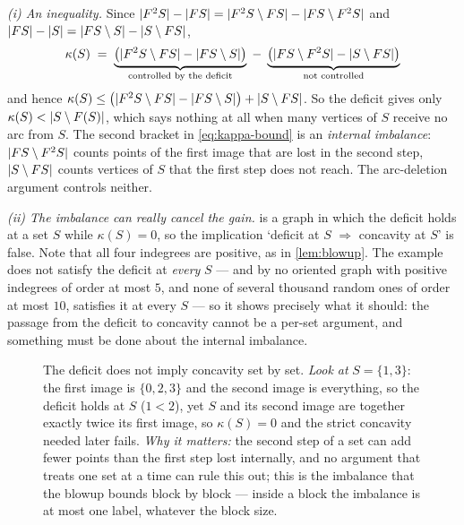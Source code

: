 \emph{(i) An inequality.} Since $\lvert F^2S\rvert-\lvert FS\rvert=\lvert F^2S\setminus FS\rvert-\lvert FS\setminus F^2S\rvert$
and $\lvert FS\rvert-\lvert S\rvert=\lvert FS\setminus S\rvert-\lvert S\setminus FS\rvert$,
\begin{equation}\label{eq:kappa-bound}
 \kappa(S)
 \;=\;\underbrace{\bigl(\lvert F^2S\setminus FS\rvert-\lvert FS\setminus S\rvert\bigr)}_{\text{controlled by
 the deficit}}
 \;-\;\underbrace{\bigl(\lvert FS\setminus F^2S\rvert-\lvert S\setminus FS\rvert\bigr)}_{\text{not controlled}}
\end{equation}
and hence $\kappa(S)\le\bigl(\lvert F^2S\setminus FS\rvert-\lvert FS\setminus S\rvert\bigr)+\lvert S\setminus FS\rvert$.
So the deficit gives only $\kappa(S)<\lvert S\setminus F(S)\rvert$, which says nothing at all when many
vertices of $S$ receive no arc from $S$. The second bracket in \eqref{eq:kappa-bound} is an
\emph{internal imbalance}: $\lvert FS\setminus F^2S\rvert$ counts points of the first image that are lost in
the second step, $\lvert S\setminus FS\rvert$ counts vertices of $S$ that the first step does not reach. The
arc-deletion argument controls neither.

\emph{(ii) The imbalance can really cancel the gain.}  is a graph in which the
deficit holds at a set $S$ while $\kappa(S)=0$, so the implication `deficit at $S$ $\Rightarrow$
concavity at $S$' is false. Note that all four indegrees are positive, as in
\cref{lem:blowup}. The example does not satisfy the deficit at \emph{every} $S$ --- and by
 no oriented graph with positive indegrees of order at most $5$, and none of several
thousand random ones of order at most $10$, satisfies it at every $S$ --- so it shows precisely what
it should: the passage from the deficit to concavity cannot be a per-set argument, and something must
be done about the internal imbalance.

\begin{figure}[t]
\centering

\caption{The deficit does not imply concavity set by set. \emph{Look at} $S=\{1,3\}$: the first image
 is $\{0,2,3\}$ and the second image is everything, so the deficit holds at $S$
 ($1<2$), yet $S$ and its second image are together exactly twice its first image, so $\kappa(S)=0$
 and the strict concavity needed later fails. \emph{Why it matters:} the second step of a set can add
 fewer points than the first step lost internally, and no argument that treats one set at a time can
 rule this out; this is the imbalance that the blowup bounds block by block --- inside a block the
 imbalance is at most one label, whatever the block size.}
\label{fig:witness}
\end{figure}


